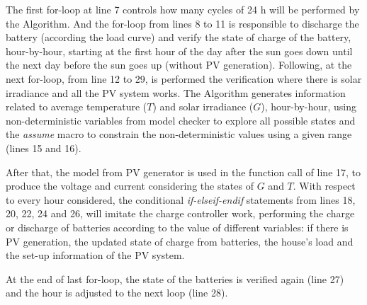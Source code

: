\documentclass[review]{elsarticle}
\begin{document}
The first for-loop at line 7 controls how many cycles of 24 h will be performed by the Algorithm.  And the for-loop from lines 8 to 11 is responsible to discharge the battery (according the load curve) and verify the state of charge of the battery, hour-by-hour, starting at the first hour of the day after the sun goes down until the next day before the sun goes up (without PV generation). Following, at the next for-loop, from line 12 to 29, is performed the verification where there is solar irradiance and all the PV system works. The Algorithm generates information related to average temperature ($T$) and solar irradiance ($G$), hour-by-hour, using non-deterministic variables from model checker to explore all possible states and the \textit{assume} macro to constrain the non-deterministic values using a given range (lines 15 and 16). 

After that, the model from PV generator is used in the function call of line 17, to produce the voltage and current considering the states of $G$ and $T$. With respect to every hour considered, the conditional \textit{if-elseif-endif} statements from lines 18, 20, 22, 24 and 26, will imitate the charge controller work, performing the charge or discharge of batteries according to the value of different variables: if there is PV generation, the updated state of charge from batteries, the house's load and the set-up information of the PV system.

At the end of last for-loop, the state of the batteries is verified again (line 27) and the hour is adjusted to the next loop (line 28).
\end{document}
